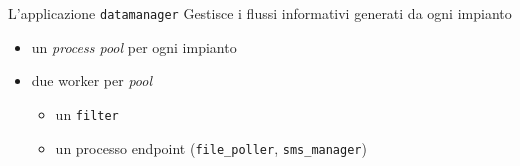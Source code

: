 \documentclass{beamer}
\newcommand{\red}[1]{\textcolor[rgb]{.8,0,0}{#1}}
\newcommand{\green}[1]{\textcolor[rgb]{0,.6,.1}{#1}}
\begin{document}
%
%

%
%

%
\begin{frame}{L'applicazione \texttt{datamanager}}
%
Gestisce i flussi informativi generati da ogni impianto
%
\begin{figure}[!h]
  \begin{center}
  \end{center}
\end{figure}
%
\begin{itemize}
\item un \emph{process pool} per ogni impianto
\item due \red{worker} per \emph{pool}
  \begin{itemize}
  \item un \texttt{filter}
  \item un processo \red{endpoint} (\texttt{file\_poller}, \texttt{sms\_manager})
  \end{itemize}
\end{itemize}
%
\end{frame}
%
\end{document}
